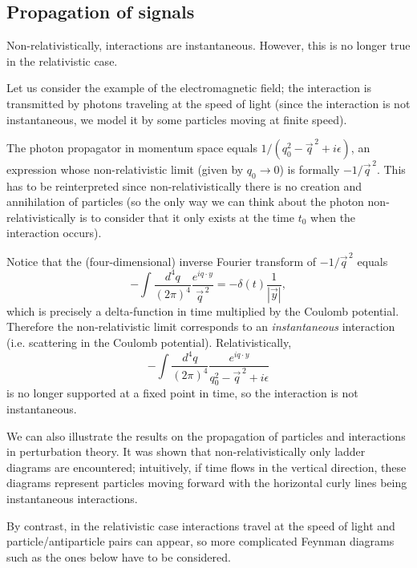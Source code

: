 \documentclass[11pt]{article}
\def\d{\delta}
\def\e{\epsilon}
\def\p{\pi}
\newcommand{\vy}{{\vec{y}}}
\newcommand{\vq}{{\vec{q}}}
\newcommand{\rarr}{\rightarrow}
\newcommand{\equ}[1]{\begin{equation}{#1}\end{equation}}
\begin{document}
\subsection{Propagation of signals}

Non-relativistically, interactions are instantaneous. However, this is no
longer true in the relativistic case.

 Let us consider the example of the electromagnetic field; the 
interaction is transmitted by photons traveling at the speed of light
(since the interaction is not instantaneous,
we model it by some particles
moving at finite speed).

The photon propagator in momentum space equals $1/ (q_0^2 - \vq^{\, 2} +i\e )$, 
an expression whose
non-relativistic limit (given by $q_0\rarr 0$)
 is formally $-1/\vq^{\, 2}$. This has to be reinterpreted since
non-relativistically there is no creation and annihilation of particles
(so the only way we can think about the photon non-relativistically
is to consider that it only exists at the time $t_0$ when the interaction
occurs).

Notice that the (four-dimensional) inverse Fourier transform of $-1/\vq^{\, 2}$ equals
\equ{  -\int \frac{d^4 q}{(2\p )^4} \frac{e^{iq\cdot y}}{\vq^{\,2}} =-\d (t)\frac{1}{|\vy |}, }
which is precisely a delta-function in time multiplied by the Coulomb potential.
Therefore the non-relativistic limit corresponds to an {\em instantaneous} interaction
(i.e. scattering in the Coulomb potential). Relativistically, 
\equ{  -\int \frac{d^4 q}{(2\p )^4} \frac{e^{iq\cdot y}}{q_0^2 -\vq^{\, 2} +i\e} }
is no longer supported at a fixed point in time, so the interaction
is not instantaneous.

We can also illustrate the results on the propagation of particles
and interactions in perturbation theory. It was shown that non-relativistically
only ladder diagrams are encountered; intuitively, if time flows in the
vertical direction, these diagrams represent particles moving forward
with the horizontal curly lines being instantaneous interactions.

\begin{center}


\end{center}

By contrast, in the relativistic case interactions travel at the speed of light
and particle/antiparticle pairs can appear, so more complicated Feynman
diagrams such as the ones below have to be considered.
\end{document}
